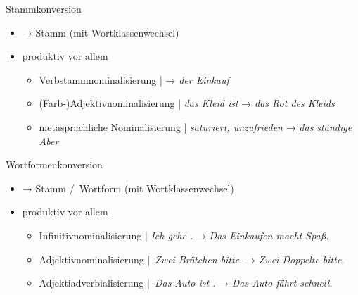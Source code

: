 \begin{frame}
  {Stammkonversion}
  \pause
  \begin{itemize}[<+->]
    \item {} → \alert{Stamm} \alert{(mit Wortklassenwechsel)}
      \Halbzeile
    \item produktiv vor allem 
      \Halbzeile
      \begin{itemize}[<+->]
        \item \alert{Verbstammnominalisierung} | \textit{} → \textit{der \alert{Einkauf}}\\
          \Halbzeile

        \item \alert{(Farb-)Adjektivnominalisierung} | \textit{das Kleid ist } → \textit{das \alert{Rot} des Kleids}\\
          \Halbzeile

        \item \alert{metasprachliche Nominalisierung} | \textit{saturiert,  unzufrieden} → \textit{das ständige \alert{Aber}}\\

      \end{itemize}
  \end{itemize}
\end{frame}

\begin{frame}
  {Wortformenkonversion}
  \pause
  \begin{itemize}[<+->]
    \item {} → \alert{Stamm \slash\ Wortform} (mit Wortklassenwechsel)
      \Halbzeile
    \item produktiv vor allem
      \Halbzeile
      \begin{itemize}[<+->]
        \item \alert{Infinitivnominalisierung} | \textit{Ich gehe .} → \textit{Das \alert{Einkaufen} macht Spaß.}\\
          \Halbzeile

        \item \alert{Adjektivnominalisierung} | \textit{Zwei  Brötchen bitte.} → \textit{Zwei \alert{Doppelte} bitte.}\\
          \Halbzeile

        \item \alert{Adjektiadverbialisierung} | \textit{Das Auto ist .} → \textit{Das Auto fährt \alert{schnell}.}\\
      \end{itemize}
  \end{itemize}
\end{frame}

